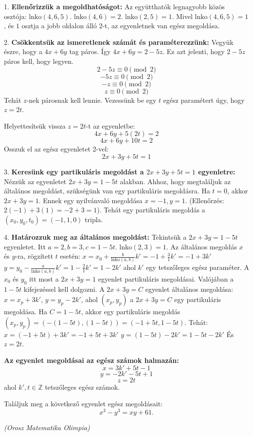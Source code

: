 \begin{solution}
	1.  \textbf{Ellenőrizzük a megoldhatóságot:}
	Az együtthatók legnagyobb közös osztója: $\text{lnko}(4, 6, 5)$.
	$\text{lnko}(4, 6) = 2$.
	$\text{lnko}(2, 5) = 1$.
	Mivel $\text{lnko}(4, 6, 5) = 1$, és $1$ osztja a jobb oldalon álló $2$-t, az egyenletnek van egész megoldása.
	
	2.  \textbf{Csökkentsük az ismeretlenek számát és paraméterezzünk:}
	Vegyük észre, hogy a $4x+6y$ tag páros. Így $4x+6y = 2-5z$. Ez azt jelenti, hogy $2-5z$ páros kell, hogy legyen.
	$$2-5z \equiv 0 \pmod{2}$$
	$$-5z \equiv 0 \pmod{2}$$
	$$-z \equiv 0 \pmod{2}$$
	$$z \equiv 0 \pmod{2}$$
	Tehát $z$-nek párosnak kell lennie. Vezessünk be egy $t$ egész paramétert úgy, hogy $z = 2t$.
	
	Helyettesítsük vissza $z=2t$-t az egyenletbe:
	$$4x+6y+5(2t)=2$$
	$$4x+6y+10t=2$$
	Osszuk el az egész egyenletet 2-vel:
	$$2x+3y+5t=1$$
	
	3.  \textbf{Keresünk egy partikuláris megoldást a $2x+3y+5t=1$ egyenletre:}
	Nézzük az egyenletet $2x+3y = 1-5t$ alakban.
	Ahhoz, hogy megtaláljuk az általános megoldást, szükségünk van egy partikuláris megoldásra.
	Ha $t=0$, akkor $2x+3y=1$. Ennek egy nyilvánvaló megoldása $x=-1, y=1$.
	(Ellenőrzés: $2(-1)+3(1) = -2+3=1$).
	Tehát egy partikuláris megoldás a $(x_0, y_0, t_0) = (-1, 1, 0)$ tripla.
	
	4.  \textbf{Határozzuk meg az általános megoldást:}
	Tekintsük a $2x+3y = 1-5t$ egyenletet. Itt $a=2, b=3, c=1-5t$. $\text{lnko}(2,3)=1$.
	Az általános megoldás $x$ és $y$-ra, rögzített $t$ esetén:
	$x = x_0 + \frac{b}{\text{lnko}(a,b)} k' = -1 + \frac{3}{1} k' = -1 + 3k'$
	$y = y_0 - \frac{a}{\text{lnko}(a,b)} k' = 1 - \frac{2}{1} k' = 1 - 2k'$
	ahol $k'$ egy tetszőleges egész paraméter.
	A $x_0$ és $y_0$ itt most a $2x+3y=1$ egyenlet partikuláris megoldásai.
	Valójában a $1-5t$ kifejezéssel kell dolgozni.
	A $2x+3y = C$ egyenlet általános megoldása: $x = x_p + 3k'$, $y = y_p - 2k'$, ahol $(x_p, y_p)$ a $2x+3y=C$ egy partikuláris megoldása.
	Ha $C=1-5t$, akkor egy partikuláris megoldás $(x_p, y_p) = (-(1-5t), (1-5t)) = (-1+5t, 1-5t)$.
	Tehát:
	$x = (-1+5t) + 3k' = -1+5t+3k'$
	$y = (1-5t) - 2k' = 1-5t-2k'$
	És $z = 2t$.
	
	\textbf{Az egyenlet megoldásai az egész számok halmazán:}
	$$x = 3k' + 5t - 1$$
	$$y = -2k' - 5t + 1$$
	$$z = 2t$$
	ahol $k', t \in \mathbb{Z}$ tetszőleges egész számok.
\end{solution}
\begin{extraproblem}
	Találjuk meg a következő egyenlet egész megoldásait: 
	\[
	x^{3}-y^{3}=xy+61.
	\]
	
	\emph{(Orosz Matematika Olimpia) }
\end{extraproblem}

